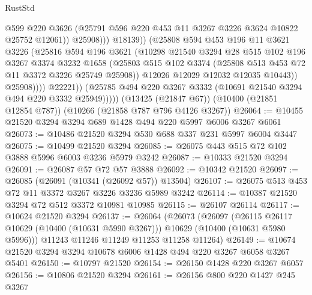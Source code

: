 \begin{lexlean}{RustStd}
\begin{coremodule}
                                @599
                                @220
                                @3626
                                (@25791 @596 @220 @453 @11 @3267 @3226 @3624 @10822 @25752 @12061))
                              @25908)))
                        @18139))
                    (@25808
                      @594
                      @453
                      @196
                      @11
                      @3621
                      @3226
                      (@25816
                        @594
                        @196
                        @3621
                        (@10298
                          @21540
                          @3294
                          @28
                          @515
                          @102
                          @196
                          @3267
                          @3374
                          @3232
                          @1658
                          (@25803
                            @515
                            @102
                            @3374
                            (@25808 @513 @453 @72 @11 @3372 @3226 @25749 @25908))
                          @12026
                          @12029
                          @12032
                          @12035
                          @10443))
                      @25908))))
              @22221))
          (@25785 @494 @220 @3267 @3332 (@10691 @21540 @3294 @494 @220 @3332 @25949)))))
    (@13425 (@21847 @67))
    (@10400 (@21851 @12854 @787))
    (@10266 (@21858 @787 @796 @4126 @3267))
@26064 := @10455 @21520 @3294 @3294 @689 @1428 @494 @220 @5997 @6006 @3267 @6061
@26073 := @10486 @21520 @3294 @530 @688 @337 @231 @5997 @6004 @3447
@26075 := @10499 @21520 @3294
@26085 := @26075 @443 @515 @72 @102 @3888 @5996 @6003 @3236 @5979 @3242
@26087 := @10333 @21520 @3294
@26091 := @26087 @57 @72 @57 @3888
@26092 := @10342 @21520
@26097 := @26085 (@26091 (@10341 (@26092 @57)) @13504)
@26107 := @26075 @513 @453 @72 @11 @3372 @3267 @3226 @3236 @5989 @3242
@26114 := @10387 @21520 @3294 @72 @512 @3372 @10981 @10985
@26115 := @26107 @26114
@26117 := @10624 @21520 @3294
@26137 := @26064
    (@26073
      (@26097
        (@26115 @26117 @10629 (@10400 (@10631 @5990 @3267)))
        @10629
        (@10400 (@10631 @5980 @5996)))
      @11243
      @11246
      @11249
      @11253
      @11258
      @11264)
@26149 := @10674 @21520 @3294 @3294 @10678 @6006 @1428 @494 @220 @3267 @6058 @3267 @5401
@26150 := @10797 @21520
@26154 := @26150 @1428 @220 @3267 @6057
@26156 := @10806 @21520 @3294
@26161 := @26156 @800 @220 @1427 @245 @3267

\end{coremodule}
\end{lexlean}
